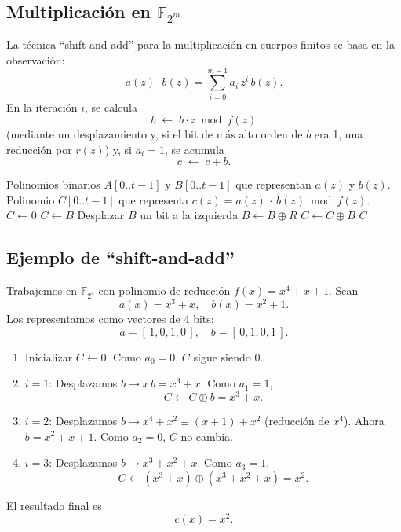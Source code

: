 \subsection{Multiplicación en \texorpdfstring{$\mathbb{F}_{2^m}$}{F2m}}
La técnica ``shift-and-add'' para la multiplicación en cuerpos finitos se basa en la observación:
\[
  a(z)\cdot b(z)
  =\sum_{i=0}^{m-1} a_i\,z^i\,b(z).
\]
En la iteración \(i\), se calcula 
\[
  b \;\leftarrow\; b\cdot z \bmod f(z)
\]
(mediante un desplazamiento y, si el bit de más alto orden de \(b\) era 1, una reducción por \(r(z)\)) y, si \(a_i=1\), se acumula 
\[
  c \;\leftarrow\; c + b.
\]

\begin{algorithm}
\caption{Multiplicación ``shift-and-add'' en \(\mathbb{F}_{2^m}\)}
\label{alg:mul_f2m}
\begin{algorithmic}[1]
\Require Polinomios binarios \(A[0..t-1]\) y \(B[0..t-1]\) que representan \(a(z)\) y \(b(z)\).
\Ensure Polinomio \(C[0..t-1]\) que representa \(c(z)=a(z)\,\cdot\,b(z)\bmod f(z)\).
\State \(C \gets 0\)
  \State \(C \gets B\)
\EndIf
{}
  \State Desplazar \(B\) un bit a la izquierda
    \State \(B \gets B \oplus R\)
  \EndIf
    \State \(C \gets C \oplus B\)
  \EndIf
\EndFor
\State \Return \(C\)
\end{algorithmic}
\end{algorithm}

\subsection*{Ejemplo de ``shift-and-add''}

Trabajemos en \(\mathbb{F}_{2^4}\) con polinomio de reducción \(f(x)=x^4 + x + 1\).  
Sean
\[
  a(x) = x^3 + x,\quad b(x) = x^2 + 1.
\]
Los representamos como vectores de 4 bits: 
\[
  a = [\,1,0,1,0\,],\quad b = [\,0,1,0,1\,].
\]
\begin{enumerate}
  \item Inicializar \(C\gets0\). Como \(a_0=0\), \(C\) sigue siendo 0.
  \item \(i=1\): Desplazamos \(b\to x\,b = x^3 + x\). Como \(a_1=1\), 
    \[
      C \gets C \oplus b = x^3 + x.
    \]
  \item \(i=2\): Desplazamos \(b\to x^4 + x^2 \equiv (x+1) + x^2\) (reducción de \(x^4\)). 
    Ahora \(b = x^2 + x + 1\). Como \(a_2=0\), \(C\) no cambia.
  \item \(i=3\): Desplazamos \(b\to x^3 + x^2 + x\). Como \(a_3=1\), 
    \[
      C \gets (x^3 + x)\oplus(x^3 + x^2 + x) = x^2.
    \]
\end{enumerate}
El resultado final es 
\[
  c(x) = x^2.
\]

